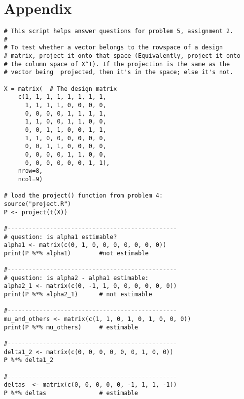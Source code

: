 \documentclass[paper=a4, fontsize=11pt]{scrartcl} %
\begin{document}
\pagebreak
\section*{Appendix}

\begin{lstlisting}[basicstyle=\ttfamily\small\bfseries]
# This script helps answer questions for problem 5, assignment 2.
#
# To test whether a vector belongs to the rowspace of a design 
# matrix, project it onto that space (Equivalently, project it onto 
# the column space of X^T). If the projection is the same as the 
# vector being  projected, then it's in the space; else it's not.

X = matrix(  # The design matrix
    c(1, 1, 1, 1, 1, 1, 1, 1,
      1, 1, 1, 1, 0, 0, 0, 0,
      0, 0, 0, 0, 1, 1, 1, 1,
      1, 1, 0, 0, 1, 1, 0, 0,
      0, 0, 1, 1, 0, 0, 1, 1,
      1, 1, 0, 0, 0, 0, 0, 0,
      0, 0, 1, 1, 0, 0, 0, 0,
      0, 0, 0, 0, 1, 1, 0, 0,
      0, 0, 0, 0, 0, 0, 1, 1), 
    nrow=8, 
    ncol=9) 

# load the project() function from problem 4:
source("project.R")
P <- project(t(X))

#------------------------------------------------
# question: is alpha1 estimable?
alpha1 <- matrix(c(0, 1, 0, 0, 0, 0, 0, 0, 0))
print(P %*% alpha1)        #not estimable

#------------------------------------------------
# question: is alpha2 - alpha1 estimable:
alpha2_1 <- matrix(c(0, -1, 1, 0, 0, 0, 0, 0, 0))
print(P %*% alpha2_1)      # not estimable 

#------------------------------------------------
mu_and_others <- matrix(c(1, 1, 0, 1, 0, 1, 0, 0, 0))
print(P %*% mu_others)     # estimable

#------------------------------------------------
delta1_2 <- matrix(c(0, 0, 0, 0, 0, 0, 1, 0, 0))
P %*% delta1_2

#------------------------------------------------
deltas  <- matrix(c(0, 0, 0, 0, 0, -1, 1, 1, -1))
P %*% deltas               # estimable 
\end{lstlisting}
\end{document}
